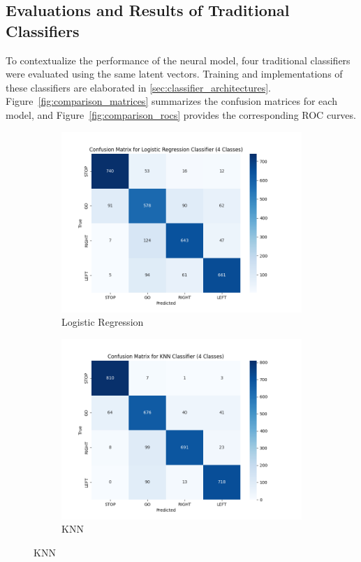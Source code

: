 \subsection{Evaluations and Results of Traditional Classifiers} \label{subsec:comparision_with_traditional_classifiers}

To contextualize the performance of the neural model, four traditional classifiers were evaluated using the same latent vectors. Training and implementations of these classifiers are elaborated in \cref{sec:classifier_architectures}. Figure~\ref{fig:comparison_matrices} summarizes the confusion matrices for each model, and Figure~\ref{fig:comparison_rocs} provides the corresponding ROC curves.

\begin{figure}[h]
\centering
\begin{subfigure}{0.48\textwidth}
    \includegraphics[width=\linewidth]{img/classifier/logistic_regression_confucion_matrix.png}
    \caption{Logistic Regression}
\end{subfigure}
\begin{subfigure}{0.48\textwidth}
    \includegraphics[width=\linewidth]{img/classifier/KNN_confucion_matrix.png}
    \caption{KNN}
\end{subfigure}


\end{figure}

